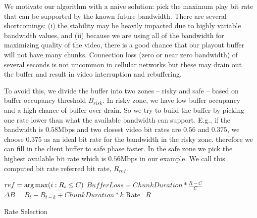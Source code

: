We motivate our algorithm with a naive solution: pick the maximum
 play bit rate that can be supported by the known future bandwidth. 
There are several shortcomings: (i) the stability may be heavily
impacted due to highly variable bandwidth values, and (ii)
because we are using all of the bandwidth for maximizing quality of
the video, there is a good chance that our playout buffer will not
have many chunks. 
Connection loss (zero or near zero bandwidth) of several seconds is
not uncommon in  cellular networks but these may drain out the buffer
and result in video interruption and rebuffering.

To avoid this, we divide the
buffer into two zones -- risky and safe -- based on buffer occupancy
threshold $B_{risk} $. In risky zone, we have low buffer occupancy and
a high chance of buffer over-drain. So we try to build the buffer by
picking one rate lower than what the available bandwidth can support.
E.g., if the bandwidth is $0.58$Mbps and two closest video
bit rates are $0.56$ and $0.375$, we choose $ 0.375$ as an
ideal bit rate for the bandwidth in the risky zone. 
 therefore we can
fill in the client buffer to safe phase faster. 
In the safe zone we
pick the highest available bit rate which is $0.56$Mbps in our
example. We call this computed bit rate referred bit rate, $R_{ref}$.

\begin{algorithm} [t]
\SetAlgoLined
${ref} = \operatorname*{arg\,max} ({i: R_i \le C})$\;
 {
 {
 $BufferLoss=ChunkDuration*\frac{R-C}{C}$\;
 $\Delta B = B_{t} -B_{t-k} +ChunkDuration*k$\;
 \uIf{$\Delta B>BLoss$}
 {Rate=$R$}
 }
 }
\caption{Rate Selection} \label{cap:algorithm}
\end{algorithm} 

